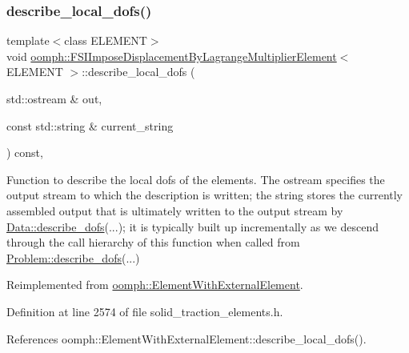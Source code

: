 \subsubsection{\texorpdfstring{describe\+\_\+local\+\_\+dofs()}{describe\_local\_dofs()}}
{\footnotesize\ttfamily template$<$class E\+L\+E\+M\+E\+NT$>$ \\
void \hyperlink{classoomph_1_1FSIImposeDisplacementByLagrangeMultiplierElement}{oomph\+::\+F\+S\+I\+Impose\+Displacement\+By\+Lagrange\+Multiplier\+Element}$<$ E\+L\+E\+M\+E\+NT $>$\+::describe\+\_\+local\+\_\+dofs (\begin{DoxyParamCaption}\item[{std\+::ostream \&}]{out,  }\item[{const std\+::string \&}]{current\+\_\+string }\end{DoxyParamCaption}) const\hspace{0.3cm}{\ttfamily [inline]}, {\ttfamily [virtual]}}



Function to describe the local dofs of the elements. The ostream specifies the output stream to which the description is written; the string stores the currently assembled output that is ultimately written to the output stream by \hyperlink{classoomph_1_1Data_a2dae16e2dcff9a40029f834c83364df5}{Data\+::describe\+\_\+dofs}(...); it is typically built up incrementally as we descend through the call hierarchy of this function when called from \hyperlink{classoomph_1_1Problem_abc103804eb319ae0b3d43870cc3e1eaf}{Problem\+::describe\+\_\+dofs}(...) 



Reimplemented from \hyperlink{classoomph_1_1ElementWithExternalElement_a2a1753bed2e822d399aa3525f1bdac4b}{oomph\+::\+Element\+With\+External\+Element}.



Definition at line 2574 of file solid\+\_\+traction\+\_\+elements.\+h.



References oomph\+::\+Element\+With\+External\+Element\+::describe\+\_\+local\+\_\+dofs().

\mbox{\label{classoomph_1_1FSIImposeDisplacementByLagrangeMultiplierElement_a48006d22e0ad79703914c687390150b8}} 
